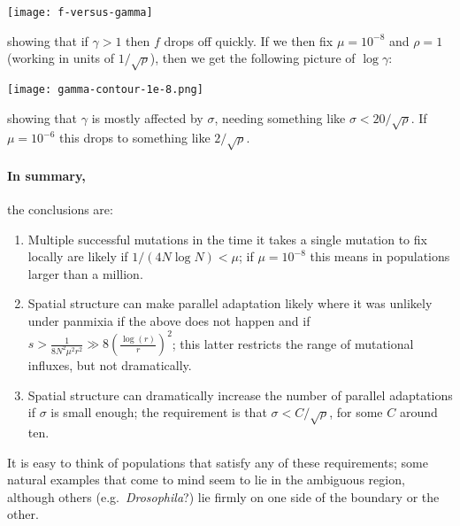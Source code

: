 \documentclass{article}
\begin{document}
\texttt{[image: f-versus-gamma]}

showing that if $\gamma>1$ then $f$ drops off quickly.
If we then fix $\mu=10^{-8}$ and $\rho=1$ (working in units of $1/\sqrt{\rho}$), 
then we get the following picture of $\log \gamma$:

\texttt{[image: gamma-contour-1e-8.png]}

showing that $\gamma$ is mostly affected by $\sigma$,
needing something like $\sigma<20/\sqrt{\rho}$.
If $\mu=10^{-6}$ this drops to something like $2/\sqrt{\rho}$.

\paragraph{In summary,}
the conclusions are:
\begin{enumerate}

  \item Multiple successful mutations in the time it takes a single mutation to fix locally
    are likely if $1/(4 N \log N) < \mu$; if $\mu=10^{-8}$ this means in populations larger than a million.

  \item Spatial structure can make parallel adaptation likely where it was unlikely under panmixia
    if the above does not happen and if
    $s > \frac{1}{8 N^2 \mu^2 r^2} \gg 8 \left(\frac{ \log(r) }{ r }\right)^2$;
    this latter restricts the range of mutational influxes, but not dramatically.

  \item Spatial structure can dramatically increase the number of parallel adaptations if $\sigma$ is small enough;
    the requirement is that $\sigma<C/\sqrt{\rho}$, for some $C$ around ten.

\end{enumerate}

It is easy to think of populations that satisfy any of these requirements;
some natural examples that come to mind seem to lie in the ambiguous region,
although others (e.g.\ {\it Drosophila}?) lie firmly on one side of the boundary or the other.
\end{document}

